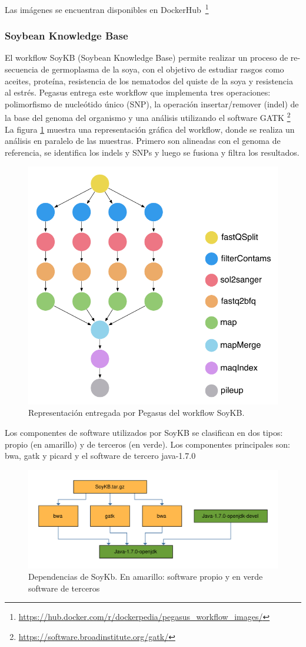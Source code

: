 Las imágenes se encuentran disponibles en DockerHub~\footnote{\url{https://hub.docker.com/r/dockerpedia/pegasus_workflow_images/}}

\subsubsection{Soybean Knowledge Base}

El workflow SoyKB (Soybean Knowledge Base) \cite{joshi2012soybean} permite realizar un proceso de re-secuencia de germoplasma de la soya, con el objetivo de estudiar rasgos como aceites, proteína, resistencia de los nematodos del quiste de la soya y resistencia al estrés.
Pegasus entrega este workflow que implementa tres operaciones: polimorfismo de nucleótido único (SNP), la operación insertar/remover (indel) de la base del genoma del organismo y una análisis utilizando el software GATK \footnote{\url{https://software.broadinstitute.org/gatk/}}
La figura \ref{fig:soykb} muestra una representación gráfica del workflow, donde se realiza un análisis en paralelo de las muestras. Primero son alineadas con el genoma de referencia,  se identifica los indels y SNPs y luego se fusiona y filtra los resultados. 

\begin{figure}[t]
\centering
\includegraphics[width=.5\textwidth]{Figures/workflow-genome}
\caption[Representación workflow: SoyKb]{Representación entregada por Pegasus del workflow SoyKB.}\label{fig:soykb}
\end{figure}

Los componentes de software utilizados por SoyKB se clasifican en dos tipos: propio (en amarillo) y de terceros (en verde). Los componentes principales son: bwa, gatk y picard y el software de tercero java-1.7.0

\begin{figure}[t]
\centering
\includegraphics[width=.8\textwidth]{Figures/soykb-deps}
\caption[Dependencias workflow SoyKb]{Dependencias de SoyKb. En amarillo: software propio y en verde software de terceros}\label{fig:soykb-deps} 
\end{figure}

